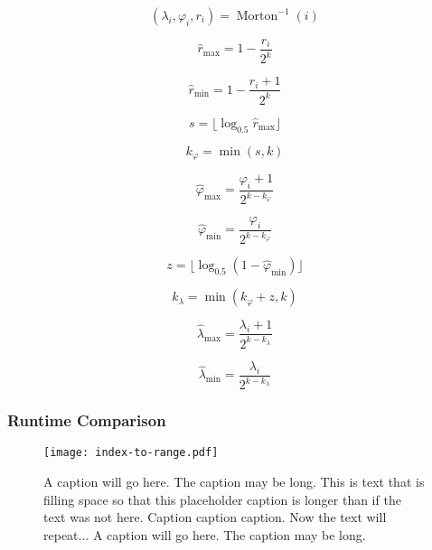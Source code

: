 \begin{equation*}
( \lambda_i, \varphi_i, r_i ) = \operatorname{Morton}^{-1} (i)%
\end{equation*}

\begin{equation*}
\hat{r}_\mathrm{max} = 1 - \frac{r_i}{2^k}
\end{equation*}

\begin{equation*}
\hat{r}_\mathrm{min} = 1 - \frac{r_i + 1}{2^k}
\end{equation*}

\begin{equation*}
s = \lfloor \log_{0.5} \hat{r}_\mathrm{max} \rfloor
\end{equation*}

\begin{equation*}
k_\varphi = \min ( s, k )
\end{equation*}

\begin{equation*}
\hat{\varphi}_\mathrm{max} = \frac{\varphi_i + 1}{2^{k - k_\varphi}}
\end{equation*}

\begin{equation*}
\hat{\varphi}_\mathrm{min} = \frac{\varphi_i}{2^{k - k_\varphi}}
\end{equation*}

\begin{equation*}
z = \lfloor \log_{0.5} ( 1 - \hat{\varphi}_\mathrm{min} ) \rfloor
\end{equation*}

\begin{equation*}
k_\lambda = \min ( k_\varphi + z, k )
\end{equation*}

\begin{equation*}
\hat{\lambda}_\mathrm{max} = \frac{\lambda_i + 1}{2^{k - k_\lambda}}
\end{equation*}

\begin{equation*}
\hat{\lambda}_\mathrm{min} = \frac{\lambda_i}{2^{k - k_\lambda}}
\end{equation*}


\subsubsection{Runtime Comparison}


\begin{figure}[htp!]
	\centering
	\texttt{[image: index-to-range.pdf]}
	\caption[Runtime comparison of SDOG decoding algorithms]{
		A caption will go here.
		The caption may be long.
		This is text that is filling space so that this placeholder caption is longer than if the text was not here.
		Caption caption caption.
		Now the text will repeat...
		A caption will go here.
		The caption may be long.
	}
	\label{fig:index-to-range}
\end{figure}


